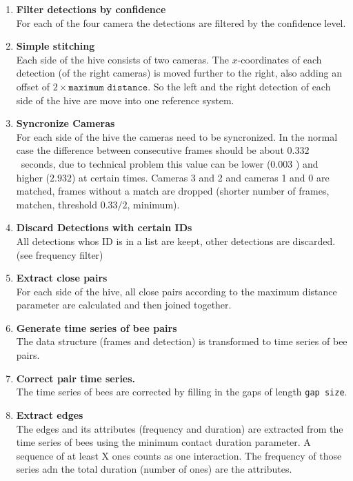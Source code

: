 \begin{enumerate}
\item \textbf{Filter detections by confidence}\\
For each of the four camera the detections are filtered by the confidence level.

\item \textbf{Simple stitching}\\
Each side of the hive consists of two cameras. 	The $x$-coordinates of each detection (of the right	cameras) is moved further to the right, also adding an offset of $2\times \texttt{maximum distance}$. So the left and the right detection of each side of the hive are move into one reference system.

\item \textbf{Syncronize Cameras}\\
For each side of the hive the cameras need to be syncronized. In the normal case the difference between consecutive frames should be about $0.332$~seconds, due to technical problem this value can be lower ($0.003$ ) and higher ($2.932$) at certain times. Cameras 3 and 2 and cameras 1 and 0 are matched, frames without a match are dropped (shorter number of frames, matchen, threshold $0.33/2$, minimum).

\item \textbf{Discard Detections with certain IDs}\\
All detections whos ID is in a list are keept, other detections are discarded. (see frequency filter)

\item \textbf{Extract close pairs}\\
For each side of the hive, all close pairs according to the maximum distance parameter are calculated and then joined together.

\item \textbf{Generate time series of bee pairs}\\
The data structure (frames and detection) is transformed to time series of bee pairs.

\item \textbf{Correct pair time series.}\\
The time series of bees are corrected by filling in the gaps of length \texttt{gap size}.

\item \textbf{Extract edges}\\
The edges and its attributes (frequency and duration) are extracted from the time series of bees using the minimum contact duration parameter. A sequence of at least X ones counts as one interaction. The frequency of those series adn the total duration (number of ones) are the attributes.


\end{enumerate}


